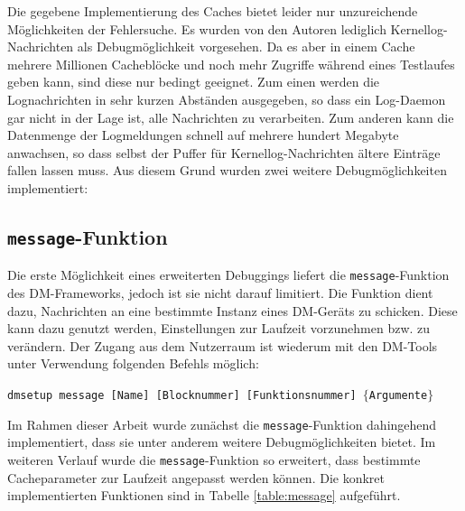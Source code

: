 Die gegebene Implementierung des Caches bietet leider nur unzureichende Möglichkeiten der Fehlersuche. Es wurden von den Autoren lediglich Kernellog-Nachrichten
als Debugmöglichkeit vorgesehen. Da es aber in einem Cache mehrere Millionen Cacheblöcke und noch mehr Zugriffe während eines Testlaufes geben kann, sind diese
nur bedingt geeignet. Zum einen werden die Lognachrichten in sehr kurzen Abständen ausgegeben, so dass ein Log-Daemon gar nicht in der Lage ist, alle Nachrichten
zu verarbeiten. Zum anderen kann die Datenmenge der Logmeldungen schnell auf mehrere hundert Megabyte anwachsen, so dass selbst der Puffer für
Kernellog-Nachrichten ältere Einträge fallen lassen muss. Aus diesem Grund wurden zwei weitere Debugmöglichkeiten implementiert:

\subsection{\texttt{message}-Funktion}

Die erste Möglichkeit eines erweiterten Debuggings liefert die \texttt{message}-Funktion des \ac{DM}-Frameworks, jedoch ist sie nicht darauf limitiert. Die
Funktion dient dazu, Nachrichten an eine bestimmte Instanz eines \ac{DM}-Geräts zu schicken. Diese kann dazu genutzt werden, Einstellungen zur Laufzeit
vorzunehmen bzw. zu verändern. Der Zugang aus dem Nutzerraum ist wiederum mit den \ac{DM}-Tools unter Verwendung folgenden Befehls möglich:

\begin{flushleft}
\hspace{0.25cm} \small \texttt{dmsetup message [Name] [Blocknummer] [Funktionsnummer] $\{$Argumente$\}$}
\end{flushleft}

Im Rahmen dieser Arbeit wurde zunächst die \texttt{message}-Funktion dahingehend implementiert, dass sie unter anderem weitere Debugmöglichkeiten bietet. Im
weiteren Verlauf wurde die \texttt{message}-Funktion so erweitert, dass bestimmte Cacheparameter zur Laufzeit angepasst werden können. Die konkret
implementierten Funktionen sind in Tabelle \ref{table:message} aufgeführt.

